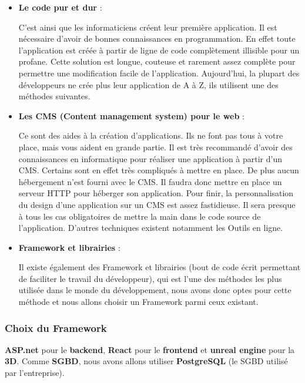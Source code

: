 \begin{itemize}
	\item \textbf{Le code pur et dur} :

	      C’est ainsi que les informaticiens créent leur première application. Il est nécessaire d’avoir de bonnes connaissances en programmation. En effet toute l'application est créée à partir de ligne de code complètement illisible pour un profane. Cette solution est longue, couteuse et rarement assez complète pour permettre une modification facile de l’application. Aujourd’hui, la plupart des développeurs ne crée plus leur application de A à Z, ils utilisent une des méthodes suivantes.

	\item \textbf{Les CMS (Content management system) pour le web} :

	      Ce sont des aides à la création d’applications. Ils ne font pas tous à votre place, mais vous aident en grande partie. Il est très recommandé d’avoir des connaissances en informatique pour réaliser une application à partir d’un CMS. Certains sont en effet très compliqués à mettre en place. De plus aucun hébergement n’est fourni avec le CMS. Il faudra donc mettre en place un serveur HTTP pour héberger son application. Pour finir, la personnalisation du design d’une application sur un CMS est assez fastidieuse. Il sera presque à tous les cas obligatoires de mettre la main dans le code source de   l’application. D’autres techniques existent notamment les Outils en ligne.

	\item \textbf{Framework et librairies} :

	      Il existe également des Framework et librairies (bout de code écrit permettant de faciliter le travail du développeur), qui est l’une des méthodes les plus utilisée dans le monde du développement, nous avons donc optes pour cette méthode et nous allons choisir un Framework parmi ceux existant.
\end{itemize}

\subsubsection{Choix du Framework}

\textbf{ASP.net} pour le \textbf{backend}, \textbf{React} pour le \textbf{frontend} et \textbf{unreal engine} pour la \textbf{3D}. Comme \textbf{SGBD}, nous avons allons utiliser \textbf{PostgreSQL} (le SGBD utilisé par l’entreprise).

